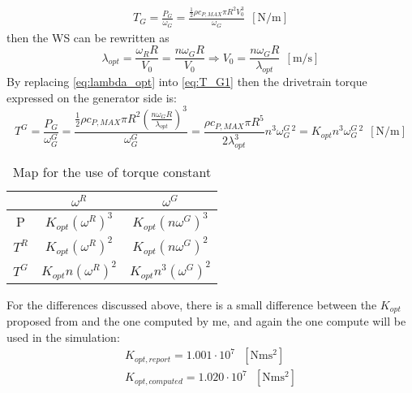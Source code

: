 \begin{gather}
    T_G=\frac{P_G}{\omega_G}=\frac{\frac{1}{2}\rho c_{P,MAX} \pi R^2 V_0^3}{\omega_G} \ \ \left[\si{\newton\per\meter}\right]
    \label{eq:T_G1}
\end{gather}
then the \acrshort{WS} can be rewritten as
\begin{equation}
    \lambda_{opt} = \frac{\omega_R R}{V_0} = \frac{n \omega_G R}{V_0} \Rightarrow V_0=\frac{n\omega_G R}{\lambda_{opt}}  \ \ \left[\si{\meter\per\second}\right]
    \label{eq:lambda_opt}
\end{equation}
By replacing \autoref{eq:lambda_opt} into \autoref{eq:T_G1} then the drivetrain torque expressed on the generator side is:
\begin{equation}
    T^G=\frac{P_G}{\omega_G^G}=\frac{\frac{1}{2}\rho c_{P,MAX} \pi R^2 \left(\frac{n\omega_G R}{\lambda_{opt}}\right)^3}{\omega_G^G} = \frac{\rho c_{P, MAX} \pi R^5 }{2 \lambda_{opt}^3}n^3\omega_G^{G \ 2} = K_{opt}n^3\omega_G^{G \ 2}  \ \ \left[\si{\newton\per\meter}\right]
    \label{eq:T_G2}
\end{equation}

\begin{table}[htb]
    \centering
    \caption{Map for the use of torque constant}
    \begin{tabular}{ccc}
    \toprule
         & $\omega^R$ & $\omega^G$  \\ \midrule
         P & $K_{opt} \left(\omega^{R}\right)^3$ & $K_{opt}\left(n \omega^{G}\right)^3$\\
         $T^R$ & $K_{opt} \left( \omega^{R}\right)^2$ & $K_{opt}\left(n \omega^{G}\right)^2$\\
         $T^G$ & $K_{opt} n \left(\omega^{R}\right)^2$ &  $K_{opt} n^3\left(\omega^{G}\right)^2$\\ \bottomrule
    \end{tabular}
    \label{tab:gain_map}
\end{table}

 For the differences discussed above, there is a small difference between the $K_{opt}$ proposed from \cite{DTU_Wind_Energy_Report-I-0092} and the one computed by me, and again the one compute will be used in the simulation:
 \begin{gather*}
     K_{opt, report} = 1.001 \cdot 10^7 \ \ \ \left[\si{\newton\meter\square\second}\right] \\
     K_{opt, computed} = 1.020 \cdot 10^7 \ \ \ \left[\si{\newton\meter\square\second}\right] 
 \end{gather*}

